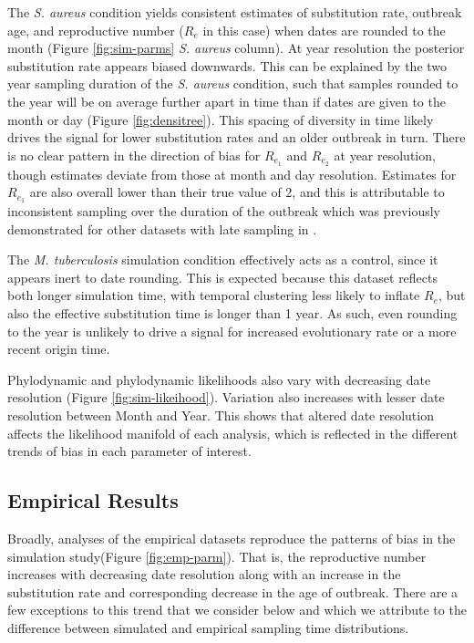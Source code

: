 \documentclass[11pt]{article}
\begin{document}
\begin{spacing}{1.5}
The \textit{S. aureus} condition yields consistent estimates of substitution rate, outbreak age, and reproductive number ($R_e$ in this case) when dates are rounded to the month (Figure \ref{fig:sim-parms} \textit{S. aureus} column). At year resolution the posterior substitution rate appears biased downwards. This can be explained by the two year sampling duration of the \textit{S. aureus} condition, such that samples rounded to the year will be on average further apart in time than if dates are given to the month or day (Figure \ref{fig:densitree}). This spacing of diversity in time likely drives the signal for lower substitution rates and an older outbreak in turn. There is no clear pattern in the direction of bias for $R_{e_1}$ and $R_{e_2}$ at year resolution, though estimates deviate from those at month and day resolution. Estimates for $R_{e_1}$ are also overall lower than their true value of 2, and this is attributable to inconsistent sampling over the duration of the outbreak which was previously demonstrated for other datasets with late sampling in \cite{featherstone_infectious_2021}.

The \textit{M. tuberculosis} simulation condition effectively acts as a control, since it appears inert to date rounding. This is expected because this dataset reflects both longer simulation time, with temporal clustering less likely to inflate $R_e$, but also the effective substitution time is longer than 1 year. As such, even rounding to the year is unlikely to drive a signal for increased evolutionary rate or a more recent origin time.

Phylodynamic and phylodynamic likelihoods also vary with decreasing date resolution (Figure \ref{fig:sim-likeihood}). Variation also increases with lesser date resolution between Month and Year. This shows that altered date resolution affects the likelihood manifold of each analysis, which is reflected in the different trends of bias in each parameter of interest.

\subsection*{Empirical Results}
Broadly, analyses of the empirical datasets reproduce the patterns of bias in the simulation study(Figure \ref{fig:emp-parm}). That is, the reproductive number increases with decreasing date resolution along with an increase in the substitution rate and corresponding decrease in the age of outbreak. There are a few exceptions to this trend that we consider below and which we attribute to the difference between simulated and empirical sampling time distributions.


\end{spacing}
\end{document}
